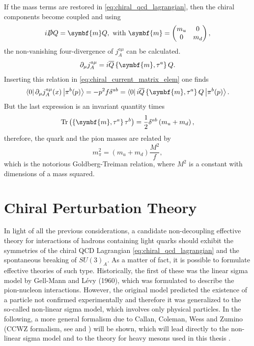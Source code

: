 If the mass terms are restored in \eqref{eq:chiral_qcd_lagrangian}, then the chiral components become coupled and using
\begin{equation}
  i \slashed{D} Q = \symbf{m} Q , \text{ with } \symbf{m} = 
  \begin{pmatrix}
    m_u & 0 \\
    0 & m_d 
  \end{pmatrix} ,
\end{equation}
the non-vanishing four-divergence of $j^{a \mu}_A$ can be calculated.
\begin{equation}
  \partial_\mu j^{a \mu}_A = i \adj{Q} \left\{ \symbf{m}, \tau^a \right\} Q .
\end{equation}
Inserting this relation in \eqref{eq:chiral_current_matrix_elem} one finds
\begin{equation}
  \left\langle 0 \right\vert \partial_\mu j^{a \mu}_A (x) \left\vert \pi^b (p) \right\rangle = - p^2 f \delta^{a b} = \left\langle 0 \right\vert i \adj{Q} \left\{ \symbf{m}, \tau^a \right\} Q \left\vert \pi^b (p) \right\rangle .
\end{equation}
But the last expression is an invariant quantity times
\begin{equation}
  \tr{\left( \left\{ \symbf{m}, \tau^a \right\} \tau^b \right)} = \frac{1}{2} \delta^{a b} \left( m_u + m_d \right) ,
\end{equation}
therefore, the quark and the pion masses are related by
\begin{equation}
  m^2_\pi = \left( m_u + m_d \right) \frac{M^2}{f} ,
\end{equation}
which is the notorious Goldberg-Treiman relation, where $M^2$ is a constant with dimensions of a mass squared.

\section{Chiral Perturbation Theory}

In light of all the previous considerations, a candidate non-decoupling effective theory for interactions of hadrons containing light quarks should exhibit the symmetries of the chiral QCD Lagrangian \eqref{eq:chiral_qcd_lagrangian} and the spontaneous breaking of $SU(3)_A$. As a matter of fact, it is possible to formulate effective theories of such type. Historically, the first of these was the linear sigma model by Gell-Mann and Lévy (1960), which was formulated to describe the pion-nucleon interactions. However, the original model predicted the existence of a particle not confirmed experimentally and therefore it was generalized to the so-called non-linear sigma model, which involves only physical particles. In the following, a more general formalism due to Callan, Coleman, Wess and Zumino (CCWZ formalism, see \cite{Coleman:1969sm} and \cite{Callan:1969sn}) will be shown, which will lead directly to the non-linear sigma model and to the theory for heavy mesons used in this thesis \cite{Manohar:1995xr}.

